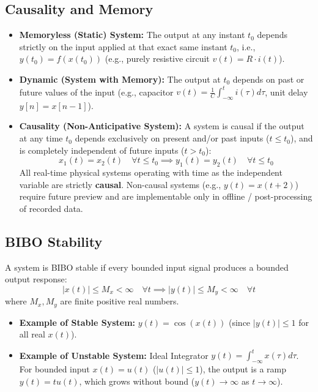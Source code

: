 \documentclass[12pt,a4paper]{article}
\begin{document}
\subsection{Causality and Memory}
\begin{itemize}[leftmargin=*, itemsep=3pt]
  \item \textbf{Memoryless (Static) System:} The output at any instant $t_0$ depends strictly on the input applied at that exact same instant $t_0$, i.e., $y(t_0) = f(x(t_0))$ (e.g., purely resistive circuit $v(t) = R \cdot i(t)$).
  \item \textbf{Dynamic (System with Memory):} The output at $t_0$ depends on past or future values of the input (e.g., capacitor $v(t) = \frac{1}{C}\int_{-\infty}^t i(\tau)d\tau$, unit delay $y[n] = x[n-1]$).
  \item \textbf{Causality (Non-Anticipative System):} A system is causal if the output at any time $t_0$ depends exclusively on present and/or past inputs ($t \le t_0$), and is completely independent of future inputs ($t > t_0$):
  \begin{equation}
    x_1(t) = x_2(t) \quad \forall t \le t_0 \implies y_1(t) = y_2(t) \quad \forall t \le t_0
  \end{equation}
  All real-time physical systems operating with time as the independent variable are strictly \textbf{causal}. Non-causal systems (e.g., $y(t) = x(t + 2)$) require future preview and are implementable only in offline / post-processing of recorded data.
\end{itemize}

\subsection{BIBO Stability}
\begin{tcolorbox}[defbox, title={\textbf{Bounded-Input Bounded-Output (BIBO) Stability}}]
A system is BIBO stable if every bounded input signal produces a bounded output response:
\begin{equation}
  |x(t)| \le M_x < \infty \quad \forall t \implies |y(t)| \le M_y < \infty \quad \forall t
\end{equation}
where $M_x, M_y$ are finite positive real numbers.
\begin{itemize}[leftmargin=*, itemsep=3pt]
  \item \textbf{Example of Stable System:} $y(t) = \cos(x(t))$ (since $|y(t)| \le 1$ for all real $x(t)$).
  \item \textbf{Example of Unstable System:} Ideal Integrator $y(t) = \int_{-\infty}^t x(\tau) d\tau$. For bounded input $x(t) = u(t)$ ($|u(t)| \le 1$), the output is a ramp $y(t) = t u(t)$, which grows without bound ($y(t) \to \infty$ as $t \to \infty$).
\end{itemize}
\end{tcolorbox}
\end{document}

